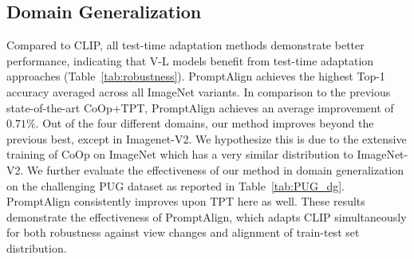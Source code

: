\documentclass[a4paper]{article}
\begin{document}

% 







\subsection{Domain Generalization}


Compared to CLIP, all test-time adaptation methods demonstrate better performance, indicating that V-L models benefit from test-time adaptation approaches (Table~\ref{tab:robustness}). PromptAlign achieves the highest Top-1 accuracy averaged across all ImageNet variants. In comparison to the previous state-of-the-art CoOp+TPT, PromptAlign achieves an average improvement of $0.71\%$. Out of the four different domains, our method improves beyond the previous best, except in Imagenet-V2. We hypothesize this is due to the extensive training of CoOp on ImageNet which has a very similar distribution to ImageNet-V2. We further evaluate the effectiveness of our method in domain generalization on the challenging PUG dataset as reported in Table~\ref{tab:PUG_dg}. PromptAlign consistently improves upon TPT here as well. These results demonstrate the effectiveness of PromptAlign, which adapts CLIP simultaneously for both robustness against view changes and alignment of train-test set distribution.
\end{document}

